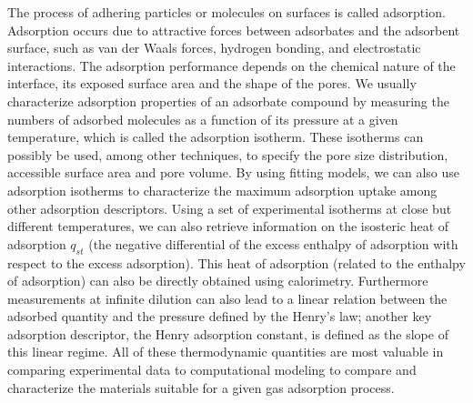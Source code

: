 \documentclass[main.tex]{subfiles}
\begin{document}
The process of adhering particles or molecules on surfaces is called adsorption. Adsorption occurs due to attractive forces between adsorbates and the adsorbent surface, such as van der Waals forces, hydrogen bonding, and electrostatic interactions. The adsorption performance depends on the chemical nature of the interface, its exposed surface area and the shape of the pores. We usually characterize adsorption properties of an adsorbate compound by measuring the numbers of adsorbed molecules as a function of its pressure at a given temperature, which is called the adsorption isotherm. These isotherms can possibly be used, among other techniques, to specify the pore size distribution, accessible surface area and pore volume.\autocite{Rouquerol_1994} By using fitting models, we can also use adsorption isotherms to characterize the maximum adsorption uptake among other adsorption descriptors.\autocite{Wang_2020} Using a set of experimental isotherms at close but different temperatures, we can also retrieve information on the isosteric heat of adsorption $q_{st}$ (the negative differential of the excess enthalpy of adsorption with respect to the excess adsorption).\autocite{Nicholson2000} This heat of adsorption (related to the enthalpy of adsorption) can also be directly obtained using calorimetry.\autocite{Dunne_1996} Furthermore measurements at infinite dilution can also lead to a linear relation between the adsorbed quantity and the pressure defined by the Henry's law; another key adsorption descriptor, the Henry adsorption constant, is defined as the slope of this linear regime.\autocite{Finsy2007} All of these thermodynamic quantities are most valuable in comparing experimental data to computational modeling to compare and characterize the materials suitable for a given gas adsorption process.
\end{document}
